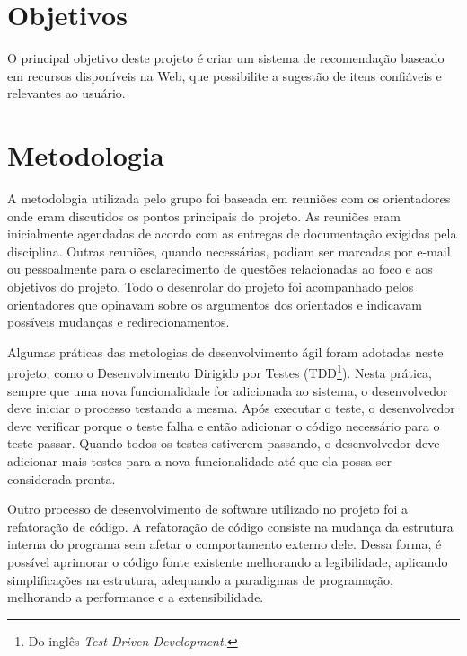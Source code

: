 

\section{Objetivos} %
\label{sec:objetivos}

 O principal objetivo deste projeto é criar um sistema de recomendação baseado em recursos disponíveis na Web, que possibilite a sugestão de itens confiáveis e relevantes ao usuário.



\section{Metodologia} %
\label{sec:metodologia}

 A metodologia utilizada pelo grupo foi baseada em reuniões com os orientadores onde eram discutidos os pontos principais do projeto. As reuniões eram inicialmente agendadas de acordo com as entregas de documentação exigidas pela disciplina. Outras reuniões, quando necessárias, podiam ser marcadas por e-mail ou pessoalmente para o esclarecimento de questões relacionadas ao foco e aos objetivos do projeto. Todo o desenrolar do projeto foi acompanhado pelos orientadores que opinavam sobre os argumentos dos orientados e indicavam possíveis mudanças e redirecionamentos.

  Algumas práticas das metologias de desenvolvimento ágil foram adotadas neste projeto, como o Desenvolvimento Dirigido por Testes (TDD\footnote{Do inglês \textit{Test Driven Development.}}). Nesta prática, sempre que uma nova funcionalidade for adicionada ao sistema, o desenvolvedor deve iniciar o processo testando a mesma. Após executar o teste, o desenvolvedor deve verificar porque o teste falha e então adicionar o código necessário para o teste passar. Quando todos os testes estiverem passando, o desenvolvedor deve adicionar mais testes para a nova funcionalidade até que ela possa ser considerada pronta.
 
 Outro processo de desenvolvimento de software utilizado no projeto foi a refatoração de código\cite{fowler1999refactoring}. A refatoração de código consiste na mudança da estrutura interna do programa sem afetar o comportamento externo dele. Dessa forma, é possível aprimorar o código fonte existente melhorando a legibilidade, aplicando simplificações na estrutura, adequando a paradigmas de programação, melhorando a performance e a extensibilidade.
 
